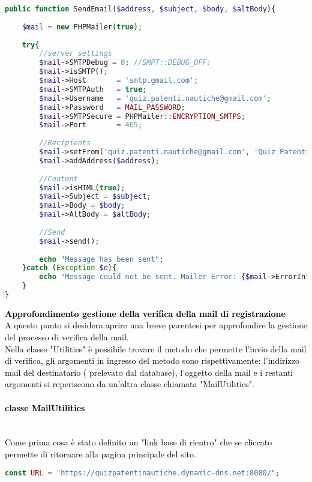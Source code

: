 \begin{lstlisting}[language=php]
public function SendEmail($address, $subject, $body, $altBody){
	
	$mail = new PHPMailer(true);
	
	try{
		//server settings
		$mail->SMTPDebug = 0; //SMPT::DEBUG_OFF;
		$mail->isSMTP();
		$mail->Host       = 'smtp.gmail.com';
		$mail->SMTPAuth   = true;
		$mail->Username   = 'quiz.patenti.nautiche@gmail.com';
		$mail->Password   = MAIL_PASSWORD;
		$mail->SMTPSecure = PHPMailer::ENCRYPTION_SMTPS;
		$mail->Port       = 465;
		
		//Recipients
		$mail->setFrom('quiz.patenti.nautiche@gmail.com', 'Quiz Patenti Nautiche');
		$mail->addAddress($address);
		
		//Content
		$mail->isHTML(true);
		$mail->Subject = $subject;
		$mail->Body = $body;
		$mail->AltBody = $altBody;
		
		//Send
		$mail->send();
		
		echo "Message has been sent";
	}catch (Exception $e){
		echo "Message could not be sent. Mailer Error: {$mail->ErrorInfo}";
	}
}
\end{lstlisting}

\textcolor{black}{
\textbf{Approfondimento gestione della verifica della mail di registrazione}\\
A questo punto si desidera aprire una breve parentesi per approfondire la gestione del processo di verifica della mail.\\
Nella classe "Utilities" è possibile trovare il metodo che permette l'invio della mail di verifica, gli argomenti in ingresso del metodo sono rispettivamente: l'indirizzo mail del destinatario ( prelevato dal database), l'oggetto della mail e i restanti argomenti si reperiscono da un'altra classe chiamata "MailUtilities".}\\

\paragraph{\textcolor{black}{classe MailUtilities}}\leavevmode\\

\textcolor{black}{Come prima cosa è stato definito un "link base di rientro" che se cliccato permette di ritornare alla pagina principale del sito.}\\

 \begin{lstlisting}[language=php]
	const URL = "https://quizpatentinautiche.dynamic-dns.net:8080/";
 \end{lstlisting}
 
